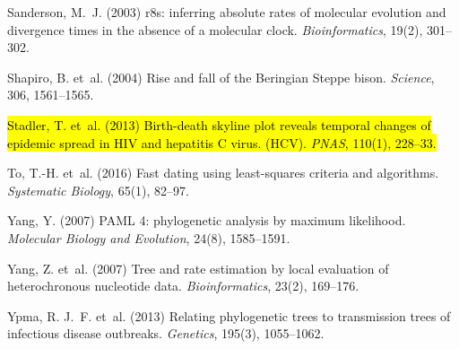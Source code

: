 \documentclass{bioinfo}
\newcommand{\edit}[1]{\hl{#1}}
\begin{document}
\begin{thebibliography}{14}
Sanderson, M.~J. (2003) {r8s}: inferring absolute rates of molecular evolution
  and divergence times in the absence of a molecular clock.
\newblock \emph{Bioinformatics}, 19(2), 301--302.

Shapiro, B. et~al. (2004) Rise and fall of the {Beringian Steppe} bison.
\newblock \emph{Science}, 306, 1561--1565.

\edit{Stadler, T. et~al. (2013) Birth-death skyline plot reveals temporal changes of epidemic spread in HIV and hepatitis C virus. (HCV).
\newblock \emph{PNAS}, 110(1), 228--33.}

To, T.-H. et~al. (2016) Fast dating using least-squares criteria and
  algorithms.
\newblock \emph{Systematic Biology}, 65(1), 82--97.

Yang, Y. (2007) {PAML} 4: phylogenetic analysis by maximum likelihood.
\newblock \emph{Molecular Biology and Evolution}, 24(8), 1585--1591.

Yang, Z. et~al. (2007) Tree and rate estimation by local evaluation of
  heterochronous nucleotide data.
\newblock \emph{Bioinformatics}, 23(2), 169--176.

Ypma, R. J.~F. et~al. (2013) Relating phylogenetic trees to transmission trees
  of infectious disease outbreaks.
\newblock \emph{Genetics}, 195(3), 1055--1062.

\end{thebibliography}
\end{document}
